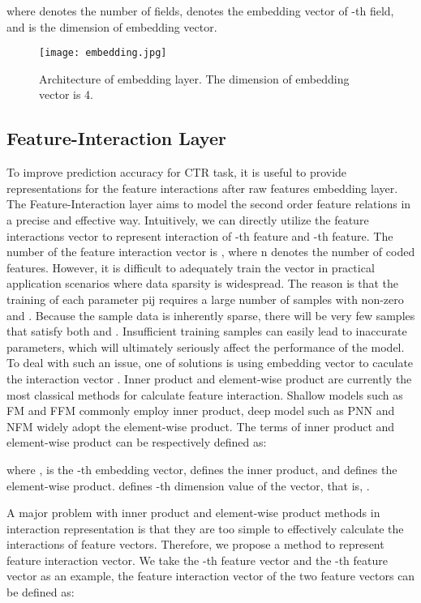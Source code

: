 \documentclass[journal]{IEEEtran}
\begin{document}
where  denotes the number of fields,  denotes the embedding vector of -th field, and  is the dimension of embedding vector.
\begin{figure}
\centering
	\texttt{[image: embedding.jpg]}
\caption{Architecture of embedding layer. The dimension of embedding vector is 4.}
	\label{fig_embedding}       \end{figure}
\subsection{Feature-Interaction Layer}
To improve prediction accuracy for CTR task, it is useful to provide representations for the feature interactions after raw features embedding layer. The Feature-Interaction layer aims to model the second order feature relations in a precise and effective way. Intuitively, we can directly utilize the feature interactions vector  to represent interaction of -th feature and -th feature. The number of the feature interaction vector is  , where n denotes the number of coded features. However, it is difficult to adequately train the vector  in practical application scenarios where data sparsity is widespread. The reason is that the training of each parameter pij requires a large number of samples with non-zero  and . Because the sample data is inherently sparse, there will be very few samples that satisfy both  and . Insufficient training samples can easily lead to inaccurate  parameters, which will ultimately seriously affect the performance of the model. To deal with such an issue, one of solutions is using embedding vector  to caculate the interaction vector . Inner product and element-wise product are currently the most classical methods for calculate feature interaction. Shallow models such as FM and FFM commonly employ inner product, deep model such as PNN and NFM widely adopt the element-wise product. The terms of inner product and element-wise product can be respectively defined as:


where ,  is the -th embedding vector,  defines the  inner product, and  defines the element-wise product.  defines -th dimension value of the vector, that is, . 

A major problem with inner product and element-wise product methods in interaction representation is that they are too simple to effectively calculate the interactions of feature vectors. Therefore, we propose a method to represent feature interaction vector. We take the -th feature vector and the -th feature vector as an example, the feature interaction vector  of the two feature vectors can be defined as: 
\end{document}
